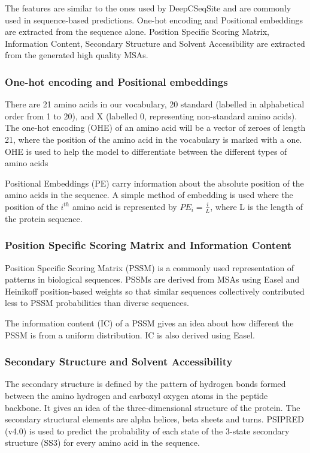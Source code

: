 \documentclass[journal=jacsat,manuscript=article]{achemso}
\begin{document}
The features are similar to the ones used by DeepCSeqSite\cite{cui2019predicting} and are commonly used in sequence-based predictions. One-hot encoding and Positional embeddings are extracted from the sequence alone. Position Specific Scoring Matrix, Information Content, Secondary Structure and Solvent Accessibility are extracted from the generated high quality MSAs.

\subsubsection{One-hot encoding and Positional embeddings}
\quad There are 21 amino acids in our vocabulary, 20 standard (labelled in alphabetical order from 1 to 20), and X (labelled 0, representing non-standard amino acids). The one-hot encoding (OHE) of an amino acid will be a vector of zeroes of length 21, where the position of the amino acid in the vocabulary is marked with a one. OHE is used to help the model to differentiate between the different types of amino acids

Positional Embeddings (PE) carry information about the absolute position of the amino acids in the sequence. A simple method of embedding is used where the position of the $i^{th}$ amino acid is represented by ${PE}_{i} = \frac{i}{L}$, where L is the length of the protein sequence.

\subsubsection{Position Specific Scoring Matrix and Information Content}
\quad Position Specific Scoring Matrix (PSSM) is a commonly used representation of patterns in biological sequences. PSSMs are derived from MSAs using Easel \cite{potter2018hmmer} and Heinikoff position-based weights so that similar sequences collectively contributed less to PSSM probabilities than diverse sequences.

The information content (IC) of a PSSM gives an idea about how different the PSSM is from a uniform distribution. IC is also derived using Easel.

\subsubsection{Secondary Structure and Solvent Accessibility}
\quad The secondary structure is defined by the pattern of hydrogen bonds formed between the amino hydrogen and carboxyl oxygen atoms in the peptide backbone. It gives an idea of the three-dimensional structure of the protein. The secondary structural elements are alpha helices, beta sheets and turns. PSIPRED (v4.0) \cite{jones1999protein} is used to predict the probability of each state of the 3-state secondary structure (SS3) for every amino acid in the sequence.
\end{document}
